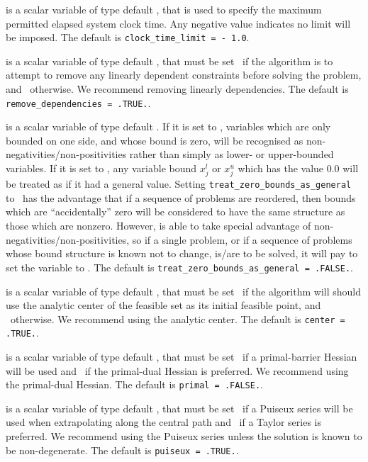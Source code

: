 \begin{description}
 is a scalar variable of type default \realdp, 
that is used to specify the maximum permitted elapsed system clock time. 
Any negative value indicates no limit will be imposed. The default is 
{\tt clock\_time\_limit = - 1.0}.

 is a scalar variable of type 
default \logical, that must be set \true\ if the algorithm
is to attempt to remove any linearly dependent constraints before
solving the problem, and \false\ otherwise. 
We recommend removing linearly dependencies.
The default is {\tt remove\_dependencies = .TRUE.}.

 is a scalar variable of type 
default \logical.
If it is set to \false, variables which 
are only bounded on one side, and whose bound is zero,
will be recognised as non-negativities/non-positivities rather than simply as
lower- or upper-bounded variables.
If it is set to \true, any variable bound 
$x_{j}^{l}$ or $x_{j}^{u}$ which has the value 0.0 will be
treated as if it had a general value.
Setting {\tt treat\_zero\_bounds\_as\_general} to \true\ has the advantage
that if a sequence of problems are reordered, then bounds which are
``accidentally'' zero will be considered to have the same structure as
those which are nonzero. However, {\tt \fullpackagename} is
able to take special advantage of non-negativities/non-positivities, so
if a single problem, or if a sequence of problems whose 
bound structure is known not to change, is/are to be solved, 
it will pay to set the variable to \false.
The default is {\tt treat\_zero\_bounds\_as\_general = .FALSE.}.

 is a scalar variable of type default \logical, that 
must be set \true\
if the algorithm will should use the analytic center
of the feasible set as its initial feasible point, 
and \false\ otherwise. 
We recommend using the analytic center.
The default is {\tt center = .TRUE.}.

 is a scalar variable of type default \logical, that 
must be set \true\
if a primal-barrier Hessian will be used
and \false\ if the primal-dual Hessian is preferred.
We recommend using the primal-dual Hessian.
The default is {\tt primal = .FALSE.}.

 is a scalar variable of type default \logical, that 
must be set \true\
if a Puiseux series will be used when extrapolating along the central path
and \false\ if a Taylor series is preferred.
We recommend using the Puiseux series unless the solution is known
to be non-degenerate.
The default is {\tt puiseux = .TRUE.}.


\end{description}
